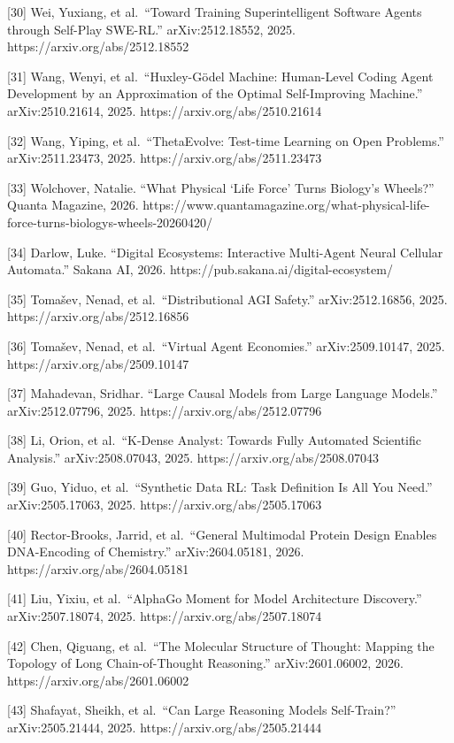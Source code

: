 \documentclass[11pt]{article}
\begin{document}
{[}30{]} Wei, Yuxiang, et al.~``Toward Training Superintelligent
Software Agents through Self-Play SWE-RL.'' arXiv:2512.18552, 2025.
https://arxiv.org/abs/2512.18552

{[}31{]} Wang, Wenyi, et al.~``Huxley-Gödel Machine: Human-Level Coding
Agent Development by an Approximation of the Optimal Self-Improving
Machine.'' arXiv:2510.21614, 2025. https://arxiv.org/abs/2510.21614

{[}32{]} Wang, Yiping, et al.~``ThetaEvolve: Test-time Learning on Open
Problems.'' arXiv:2511.23473, 2025. https://arxiv.org/abs/2511.23473

{[}33{]} Wolchover, Natalie. ``What Physical `Life Force' Turns
Biology's Wheels?'' Quanta Magazine, 2026.
https://www.quantamagazine.org/what-physical-life-force-turns-biologys-wheels-20260420/

{[}34{]} Darlow, Luke. ``Digital Ecosystems: Interactive Multi-Agent
Neural Cellular Automata.'' Sakana AI, 2026.
https://pub.sakana.ai/digital-ecosystem/

{[}35{]} Tomašev, Nenad, et al.~``Distributional AGI Safety.''
arXiv:2512.16856, 2025. https://arxiv.org/abs/2512.16856

{[}36{]} Tomašev, Nenad, et al.~``Virtual Agent Economies.''
arXiv:2509.10147, 2025. https://arxiv.org/abs/2509.10147

{[}37{]} Mahadevan, Sridhar. ``Large Causal Models from Large Language
Models.'' arXiv:2512.07796, 2025. https://arxiv.org/abs/2512.07796

{[}38{]} Li, Orion, et al.~``K-Dense Analyst: Towards Fully Automated
Scientific Analysis.'' arXiv:2508.07043, 2025.
https://arxiv.org/abs/2508.07043

{[}39{]} Guo, Yiduo, et al.~``Synthetic Data RL: Task Definition Is All
You Need.'' arXiv:2505.17063, 2025. https://arxiv.org/abs/2505.17063

{[}40{]} Rector-Brooks, Jarrid, et al.~``General Multimodal Protein
Design Enables DNA-Encoding of Chemistry.'' arXiv:2604.05181, 2026.
https://arxiv.org/abs/2604.05181

{[}41{]} Liu, Yixiu, et al.~``AlphaGo Moment for Model Architecture
Discovery.'' arXiv:2507.18074, 2025. https://arxiv.org/abs/2507.18074

{[}42{]} Chen, Qiguang, et al.~``The Molecular Structure of Thought:
Mapping the Topology of Long Chain-of-Thought Reasoning.''
arXiv:2601.06002, 2026. https://arxiv.org/abs/2601.06002

{[}43{]} Shafayat, Sheikh, et al.~``Can Large Reasoning Models
Self-Train?'' arXiv:2505.21444, 2025. https://arxiv.org/abs/2505.21444
\end{document}

